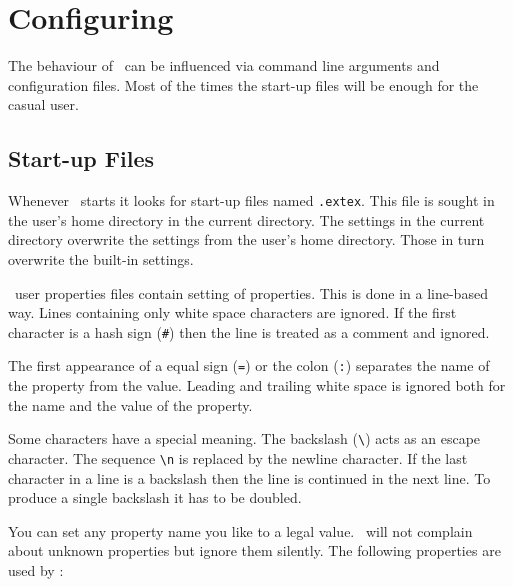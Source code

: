 \documentclass{extex-doc}
\makeatletter
\renewcommand\File[1]{\texttt{#1}\index{#1@\textsf{#1}}}
\def\n{\char`\\n}
\makeatother
\begin{document}
\section{Configuring \ExTeX}

The behaviour of \ExTeX\ can be influenced via command line arguments
and configuration files. Most of the times the start-up files will be
enough for the casual user.


\subsection{Start-up Files}

Whenever \ExTeX\ starts it looks for start-up files named
\File{.extex}. This file is sought in the user's home directory in the
current directory. The settings in the current directory overwrite the
settings from the user's home directory. Those in turn overwrite the
built-in settings.

\ExTeX\ user properties files contain setting of properties. This is
done in a line-based way. Lines containing only white space characters
are ignored. If the first character is a hash sign (\verb|#|) then the
line is treated as a comment and ignored.

The first appearance of a equal sign (\verb|=|) or the colon
(\verb|:|) separates the name of the property from the value. Leading
and trailing white space is ignored both for the name and the value of
the property.

Some characters have a special meaning. The backslash (\verb|\|) acts
as an escape character. The sequence \verb|\n| is replaced by the
newline character. If the last character in a line is a backslash then
the line is continued in the next line. To produce a single backslash
it has to be doubled.

You can set any property name you like to a legal value. \ExTeX\ will
not complain about unknown properties but ignore them silently.
The following properties are used by \ExTeX:
\end{document}
